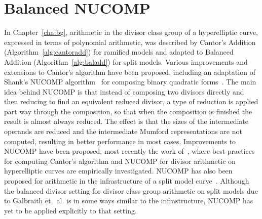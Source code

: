 
\chapter{Balanced NUCOMP}\label{cha:nucomp} In Chapter~\ref{cha:bg}, arithmetic
in the divisor class group of a hyperelliptic curve, expressed in terms of
polynomial arithmetic, was described by Cantor's Addition
(Algorithm~\ref{alg:cantoradd}) for ramified models and adapted to Balanced
Addition (Algorithm~\ref{alg:baladd}) for split models. Various improvements and
extensions to Cantor's algorithm have been proposed, including an adaptation of
Shank's NUCOMP algorithm~\cite{ShanksNUCOMP} for composing binary quadratic
forms~\cite{jacobson_nucomp_2002}. The main idea behind NUCOMP is that instead
of composing two divisors directly and then reducing to find an equivalent
reduced divisor, a type of reduction is applied part way through the
composition, so that when the composition is finished the result is almost
always reduced.  The effect is that the sizes of the intermediate operands are
reduced and the intermediate Mumford representations are not computed,
resulting in better performance in most cases. Improvements to NUCOMP have been
proposed, most recently the work of~\cite{ImbJac13:amc}, where best practices
for computing Cantor's algorithm and NUCOMP  for divisor arithmetic on
hyperelliptic curves are empirically investigated.  NUCOMP has also been
proposed for arithmetic in the infrastructure of a split model
curve~\cite{jacobson_fast_2007}. Although the balanced divisor setting for
divisor class group arithmetic on split models due to Galbraith et.\ al.
\cite{Galbraith_balanced_2008,Morales_balanced_2009} is in some ways similar to
the infrastructure, NUCOMP has yet to be applied explicitly to that setting.

